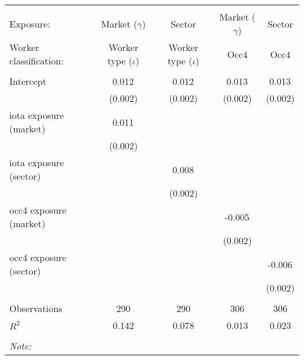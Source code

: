 \begin{tabular}{@{\extracolsep{5pt}}lcccc}
\\[-1.8ex]\hline
\hline \\[-1.8ex]
\hline \\[-1.8ex]
 Exposure: & Market ($\gamma$) & Sector & Market ($\gamma$) & Sector \\
 Worker classification: & Worker type ($\iota$) & Worker type ($\iota$) & Occ4 & Occ4 \\
 \hline &  &  &  &  \\
 Intercept & 0.012$^{}$ & 0.012$^{}$ & 0.013$^{}$ & 0.013$^{}$ \\
  & (0.002) & (0.002) & (0.002) & (0.002) \\
 iota exposure (market) & 0.011$^{}$ & & & \\
  & (0.002) & & & \\
 iota exposure (sector) & & 0.008$^{}$ & & \\
  & & (0.002) & & \\
 occ4 exposure (market) & & & -0.005$^{}$ & \\
  & & & (0.002) & \\
 occ4 exposure (sector) & & & & -0.006$^{}$ \\
  & & & & (0.002) \\
\hline \\[-1.8ex]
 Observations & 290 & 290 & 306 & 306 \\
 $R^2$ & 0.142 & 0.078 & 0.013 & 0.023 \\
\hline
\hline \\[-1.8ex]
\textit{Note:}\end{tabular}